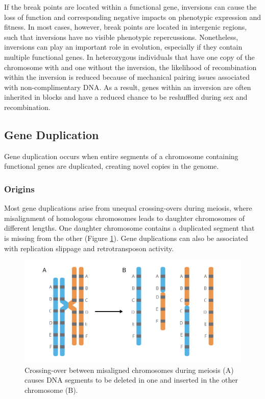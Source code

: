 \documentclass[
]{book}
\begin{document}
If the break points are located within a functional gene, inversions can cause the loss of function and corresponding negative impacts on phenotypic expression and fitness. In most cases, however, break points are located in intergenic regions, such that inversions have no visible phenotypic repercussions. Nonetheless, inversions can play an important role in evolution, especially if they contain multiple functional genes. In heterozygous individuals that have one copy of the chromosome with and one without the inversion, the likelihood of recombination within the inversion is reduced because of mechanical pairing issues associated with non-complimentary DNA. As a result, genes within an inversion are often inherited in blocks and have a reduced chance to be reshuffled during sex and recombination.

\hypertarget{gene-duplication}{%
\subsection{Gene Duplication}\label{gene-duplication}}

Gene duplication occurs when entire segments of a chromosome containing functional genes are duplicated, creating novel copies in the genome.

\hypertarget{origins-2}{%
\subsubsection*{Origins}\label{origins-2}}

Most gene duplications arise from unequal crossing-overs during meiosis, where misalignment of homologous chromosomes leads to daughter chromosomes of different lengths. One daughter chromosome contains a duplicated segment that is missing from the other (Figure \ref{fig:uneqcross}). Gene duplications can also be associated with replication slippage and retrotransposon activity.

\begin{figure}
\includegraphics[width=1\linewidth]{images/duplication} \caption{Crossing-over between misaligned chromosomes during meiosis (A) causes DNA segments to be deleted in one and inserted in the other chromosome (B).}\label{fig:uneqcross}
\end{figure}
\end{document}
